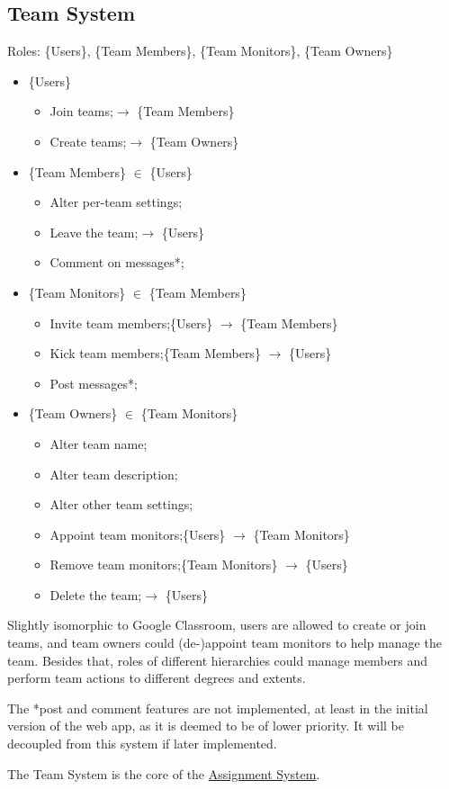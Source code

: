 \documentclass[12pt]{report}
\newcommand{\n}{\par}
\newcommand{\br}{\vspace{1 em}\n}
\begin{document}
\subsection{Team System} \label{overview.project-objectives.team-system}
Roles: \{Users\}, \{Team Members\}, \{Team Monitors\}, \{Team Owners\}\n
\begin{itemize}
	\item \{Users\}
	      \begin{itemize}
		      \item Join teams;\null\hfill $\rightarrow$ \{Team Members\}
		      \item Create teams;\null\hfill $\rightarrow$ \{Team Owners\}
	      \end{itemize}
	\item \{Team Members\} $\in$ \{Users\}
	      \begin{itemize}
		      \item Alter per-team settings;
		      \item Leave the team;\null\hfill $\rightarrow$ \{Users\}
		      \item Comment on messages*;
	      \end{itemize}
	\item \{Team Monitors\} $\in$ \{Team Members\}
	      \begin{itemize}
		      \item Invite team members;\null\hfill \{Users\} $\rightarrow$ \{Team Members\}
		      \item Kick team members;\null\hfill \{Team Members\} $\rightarrow$ \{Users\}
		      \item Post messages*;
	      \end{itemize}
	\item \{Team Owners\} $\in$ \{Team Monitors\}
	      \begin{itemize}
		      \item Alter team name;
		      \item Alter team description;
		      \item Alter other team settings;
		      \item Appoint team monitors;\null\hfill \{Users\} $\rightarrow$ \{Team Monitors\}
		      \item Remove team monitors;\null\hfill \{Team Monitors\} $\rightarrow$ \{Users\}
		      \item Delete the team;\null\hfill $\rightarrow$ \{Users\}
	      \end{itemize}
\end{itemize}\n
Slightly isomorphic to Google Classroom,
users are allowed to create or join teams, and team owners could (de-)appoint team monitors to help manage the team.
Besides that, roles of different hierarchies could manage members and perform team actions
to different degrees and extents.
\br
The *post and comment features are not implemented, at least in the initial version of the web app,
as it is deemed to be of lower priority. It will be decoupled from this system if later implemented.
\br
The Team System is the core of the \hyperref[overview.project-objectives.assignment-system]{Assignment System}.
\end{document}
